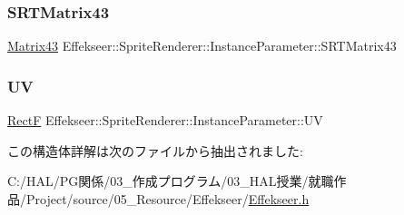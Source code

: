 \subsubsection{\texorpdfstring{S\+R\+T\+Matrix43}{SRTMatrix43}}
{\footnotesize\ttfamily \mbox{\hyperlink{struct_effekseer_1_1_matrix43}{Matrix43}} Effekseer\+::\+Sprite\+Renderer\+::\+Instance\+Parameter\+::\+S\+R\+T\+Matrix43}

\mbox{\label{struct_effekseer_1_1_sprite_renderer_1_1_instance_parameter_aedec84f7ebb3f45f2a8057990f3907ba}} 
\subsubsection{\texorpdfstring{UV}{UV}}
{\footnotesize\ttfamily \mbox{\hyperlink{struct_effekseer_1_1_rect_f}{RectF}} Effekseer\+::\+Sprite\+Renderer\+::\+Instance\+Parameter\+::\+UV}



この構造体詳解は次のファイルから抽出されました\+:\begin{DoxyCompactItemize}
\item 
C\+:/\+H\+A\+L/\+P\+G関係/03\+\_\+作成プログラム/03\+\_\+\+H\+A\+L授業/就職作品/\+Project/source/05\+\_\+\+Resource/\+Effekseer/\mbox{\hyperlink{_effekseer_8h}{Effekseer.\+h}}\end{DoxyCompactItemize}
